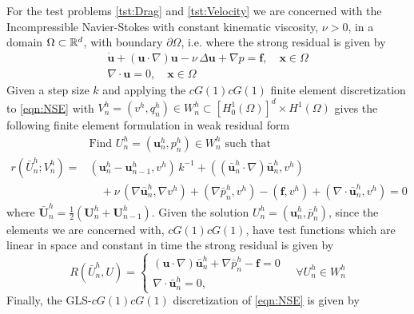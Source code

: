 For the test problems \ref{tst:Drag} and \ref{tst:Velocity} we are concerned
with the Incompressible Navier-Stokes with constant kinematic viscosity,
$\nu>0$, in a domain $\Omega\subset \mathbb{R}^d$, with boundary $\partial \Omega$, i.e.
where the strong residual is given by
\begin{equation}
    \begin{split}
      \dot{\mathbf{u}} + \left( \mathbf{u} \cdot \nabla \right) \mathbf{u} - \nu\,
          \Delta \mathbf{u} + \nabla p = \mathbf{f}, \quad \mathbf{x} \in \Omega \\
          \nabla \cdot \mathbf{u} = 0, \quad \mathbf{x} \in \Omega
    \end{split}
  \label{eqn:NSE}
\end{equation}
Given a step size $k$ and applying the $cG(1)cG(1)$ finite element
discretization to \autoref{eqn:NSE} with $V^h_n = (v^h, q^h_n) \in W^h_n
\subset [H^1_0(\Omega)]^d \times H^1(\Omega)$ gives the following finite element
formulation in weak residual form
\begin{equation}
  \begin{split}
    &\text{Find } U^h_n = (\mathbf{u}^h_n, p^h_n) \in W^h_n \text{ such that} \\
    r(\bar{U}^h_n; V^h_n) =& (\mathbf{u}^h_n - \mathbf{u}^h_{n-1}, v^h)\,k^{-1}
        + (( \bar{\mathbf{u}}^h_n \cdot \nabla ) \bar{\mathbf{u}}^h_n, v^h) \\
    &\quad+ \nu\, (\nabla \bar{\mathbf{u}}^h_n, \nabla v^h)
        + (\nabla \bar{p}^h_n, v^h) - (\mathbf{f}, v^h)
        + (\nabla \cdot \bar{\mathbf{u}}^h_n, v^h) = 0
  \end{split}
  \label{eqn:WeakNSE}
\end{equation}
where $\bar{\mathbf{U}}^h_n = \frac{1}{2}\left(\mathbf{U}^h_n +
\mathbf{U}^h_{n-1}\right)$. Given the solution $U^h_n = (\mathbf{u}^h_n,
\bar{p}^h_n)$, since the elements we are concerned with, $cG(1)cG(1)$, have
test functions which are linear in space and constant in time the strong
residual is given by
\begin{equation}
    R(\bar{U}^h_n, U) = \begin{cases}
      \left(\mathbf{u} \cdot \nabla \right) \bar{\mathbf{u}}^h_n
        + \nabla \bar{p}^h_n - \mathbf{f} = 0 \\
      \nabla \cdot \bar{\mathbf{u}}^h_n = 0,
    \end{cases} \quad \forall U^h_n \in W^h_n
  \label{eqn:StrongNSE}
\end{equation}
Finally, the GLS-$cG(1)cG(1)$ discretization of \eqref{eqn:NSE} is given by
